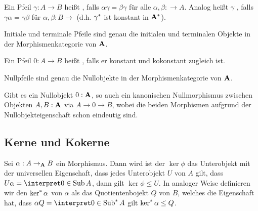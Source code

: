 \begin{definition}
    Ein Pfeil $\gamma:A\to B$ heißt , falls $\alpha\gamma=\beta\gamma$
    für alle $\alpha,\beta:\to A$. Analog heißt $\gamma$ , falls
    $\gamma\alpha=\gamma\beta$ für $\alpha,\beta:B\to$ (d.h. ${\gamma}^{\ast}$ ist konstant in ${\mathbf{A}}^{\ast}$).
\end{definition}

\begin{remark}
    Initiale und terminale Pfeile sind genau die initialen und terminalen Objekte in der Morphismenkategorie von $\mathbf{A}$. 
\end{remark}

\begin{definition}[Nullpfeil]
    Ein Pfeil $0:A\to B$ heißt , falls er konstant und kokonstant zugleich ist.
\end{definition}

\begin{remark}
    Nullpfeile sind genau die Nullobjekte in der Morphismenkategorie von $\mathbf{A}$.
\end{remark}

\begin{remark}
    Gibt es ein Nullobjekt $0:\mathbf{A}$, so auch ein kanonischen Nullmorphismus zwischen Objekten $A,B:\mathbf{A}$ via $A\to 0\to B$, wobei
    die beiden Morphismen aufgrund der Nullobjekteigenschaft schon eindeutig sind. 
\end{remark}

\subsection{Kerne und Kokerne}

\begin{definition}
Sei $\alpha:A\rightarrow_{\mathbf{A}} B$ ein Morphismus. Dann wird ist der  $\ker\phi$ das Unterobjekt mit der universellen Eigenschaft, dass jedes
Unterobjekt $U$ von $A$ gilt, dass $U\alpha=\interpret 0\in{\subobjects A}$, dann gilt $\ker\phi\leq U$.
In analoger Weise definieren wir den  $\mathop{{\mathrm{ker}}^{\ast}} \alpha$ von $\alpha$ als das Quotientenbojekt $Q$ von $B$, welches die
Eigenschaft hat, dass $\alpha Q=\interpret 0\in{\cosubobjects A}$ gilt $\mathop{{\mathrm{ker}}^{\ast}} \alpha\leq Q$.
\end{definition}


